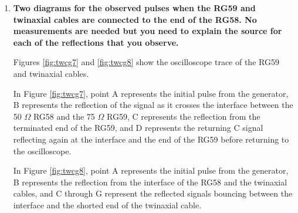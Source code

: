 \begin{enumerate}
\begin{marginfigure}
\caption{An outgoing pulse superimposed upon its reflected pulse.}
\label{fig:twcg6}
\end{marginfigure}

\item {\bf Two diagrams for the observed pulses when the RG59 and twinaxial cables are connected to the end of the RG58. No measurements are needed but you need to explain the source for each of the reflections that you observe.}\newline

Figures \ref{fig:twcg7} and \ref{fig:twcg8} show the oscilloscope trace of the RG59 and twinaxial cables. 

In Figure \ref{fig:twcg7}, point A represents the initial pulse from the generator, B represents the reflection of the signal as it crosses the interface between the 50 $\Omega$ RG58 and the 75 $\Omega$ RG59, C represents the reflection from the terminated end of the RG59, and D represents the returning C signal reflecting again at the interface and the end of the RG59 before returning to the oscilloscope.

In Figure \ref{fig:twcg8}, point A represents the initial pulse from the generator, B represents the reflection from the interface of the RG58 and the twinaxial cables, and C through G represent the reflected signals bouncing between the interface and the shorted end of the twinaxial cable.

\end{enumerate}


